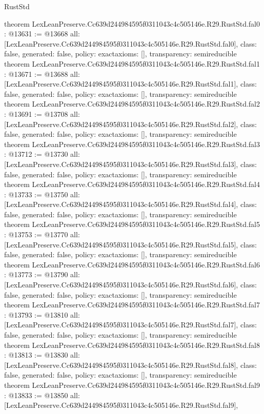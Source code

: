 \begin{lexlean}{RustStd}
\begin{coremodule}
{}
theorem LexLeanPreserve.Cc639d244984595f0311043c4c505146e.R29.RustStd.fal0 : @13631 := @13668 {
  all: [LexLeanPreserve.Cc639d244984595f0311043c4c505146e.R29.RustStd.fal0],
  class: false,
  generated: false,
  policy: exact{axioms: []},
  transparency: semireducible
}
theorem LexLeanPreserve.Cc639d244984595f0311043c4c505146e.R29.RustStd.fal1 : @13671 := @13688 {
  all: [LexLeanPreserve.Cc639d244984595f0311043c4c505146e.R29.RustStd.fal1],
  class: false,
  generated: false,
  policy: exact{axioms: []},
  transparency: semireducible
}
theorem LexLeanPreserve.Cc639d244984595f0311043c4c505146e.R29.RustStd.fal2 : @13691 := @13708 {
  all: [LexLeanPreserve.Cc639d244984595f0311043c4c505146e.R29.RustStd.fal2],
  class: false,
  generated: false,
  policy: exact{axioms: []},
  transparency: semireducible
}
theorem LexLeanPreserve.Cc639d244984595f0311043c4c505146e.R29.RustStd.fal3 : @13712 := @13730 {
  all: [LexLeanPreserve.Cc639d244984595f0311043c4c505146e.R29.RustStd.fal3],
  class: false,
  generated: false,
  policy: exact{axioms: []},
  transparency: semireducible
}
theorem LexLeanPreserve.Cc639d244984595f0311043c4c505146e.R29.RustStd.fal4 : @13733 := @13750 {
  all: [LexLeanPreserve.Cc639d244984595f0311043c4c505146e.R29.RustStd.fal4],
  class: false,
  generated: false,
  policy: exact{axioms: []},
  transparency: semireducible
}
theorem LexLeanPreserve.Cc639d244984595f0311043c4c505146e.R29.RustStd.fal5 : @13753 := @13770 {
  all: [LexLeanPreserve.Cc639d244984595f0311043c4c505146e.R29.RustStd.fal5],
  class: false,
  generated: false,
  policy: exact{axioms: []},
  transparency: semireducible
}
theorem LexLeanPreserve.Cc639d244984595f0311043c4c505146e.R29.RustStd.fal6 : @13773 := @13790 {
  all: [LexLeanPreserve.Cc639d244984595f0311043c4c505146e.R29.RustStd.fal6],
  class: false,
  generated: false,
  policy: exact{axioms: []},
  transparency: semireducible
}
theorem LexLeanPreserve.Cc639d244984595f0311043c4c505146e.R29.RustStd.fal7 : @13793 := @13810 {
  all: [LexLeanPreserve.Cc639d244984595f0311043c4c505146e.R29.RustStd.fal7],
  class: false,
  generated: false,
  policy: exact{axioms: []},
  transparency: semireducible
}
theorem LexLeanPreserve.Cc639d244984595f0311043c4c505146e.R29.RustStd.fal8 : @13813 := @13830 {
  all: [LexLeanPreserve.Cc639d244984595f0311043c4c505146e.R29.RustStd.fal8],
  class: false,
  generated: false,
  policy: exact{axioms: []},
  transparency: semireducible
}
theorem LexLeanPreserve.Cc639d244984595f0311043c4c505146e.R29.RustStd.fal9 : @13833 := @13850 {
  all: [LexLeanPreserve.Cc639d244984595f0311043c4c505146e.R29.RustStd.fal9],
}
\end{coremodule}
\end{lexlean}
